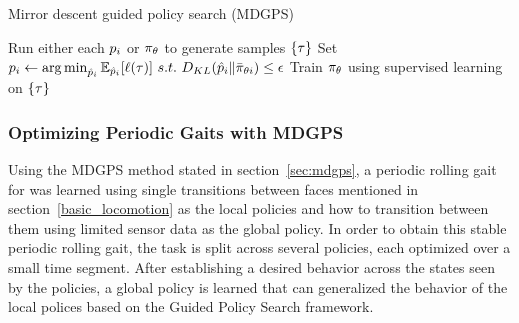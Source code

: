 \setlength{\textfloatsep}{12pt}
\begin{algorithm}[tb]
    \caption{Mirror descent guided policy search (MDGPS)}
    \label{alg:mdgps}
    \begin{algorithmic}[1]
            \STATE Run either each $p_i$ or $\pi_{\theta}$ to
            generate samples $\{\tau\}$
            \STATE Set
            $p_i\leftarrow\operatorname*{arg\,min}_{\hat{p}_i}\mathbb{E}_{\hat{p}_i}[\ell(\tau)]~s.t.~D_{KL}(\hat{p}_i\|\bar{\pi}_{\theta{i}})\leq\epsilon$
            \STATE Train $\pi_{\theta}$ using supervised learning on
            $\{\tau\}$
        \ENDFOR
    \end{algorithmic}
\end{algorithm}



\subsubsection{Optimizing Periodic Gaits with MDGPS}
\label{sec:chains}

Using the MDGPS method stated in section~\ref{sec:mdgps}, a periodic rolling gait for \SB{} was learned using single transitions between faces mentioned in section~\ref{basic_locomotion} as the local policies and how to transition between them using limited sensor data as the global policy. 
In order to obtain this stable periodic rolling gait, the task is split across several policies, each optimized over a small time segment.
After establishing a desired behavior across the states seen by the policies, a global policy is learned that can generalized the behavior of the local polices based on the Guided Policy Search framework.

